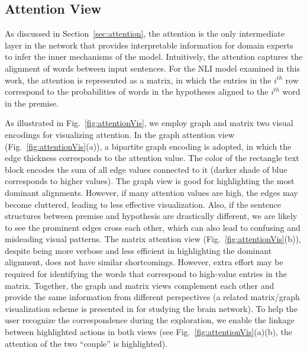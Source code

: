 

\subsection{Attention View}
\label{sec:attentionView}
As discussed in Section~\ref{sec:attention}, the attention is the only intermediate layer in the network that provides interpretable information for domain experts to infer the inner mechanisms of the model.
%
Intuitively, the attention captures the alignment of words between input sentences. For the NLI model examined in this work, the attention is represented as a matrix, in which the entries in the $i^{th}$ row correspond to the probabilities of words in the hypotheses aligned to the $i^{th}$ word in the premise.

As illustrated in Fig.~\ref{fig:attentionVis}, we employ graph and matrix two visual encodings for visualizing attention. In the graph attention view (Fig.~\ref{fig:attentionVis}(a)), a bipartite graph encoding is adopted, in which the edge thickness corresponds to the attention value. The color of the rectangle text block encodes the sum of all edge values connected to it (darker shade of blue corresponds to higher values).
%
The graph view is good for highlighting the most dominant alignments. However, if many attention values are high, the edges may become cluttered, leading to less effective visualization. Also, if the sentence structures between premise and hypothesis are drastically different, we are likely to see the prominent edges cross each other, which can also lead to confusing and misleading visual patterns.
%
The matrix attention view (Fig.~\ref{fig:attentionVis}(b)), despite being more verbose and less efficient in highlighting the dominant alignment, does not have similar shortcomings. However, extra effort may be required for identifying the words that correspond to high-value entries in the matrix. Together, the graph and matrix views complement each other and provide the same information from different perspectives (a related matrix/graph visualization scheme is presented in \cite{MaKenyonForbes2015} for studying the brain network). 
To help the user recognize the correspondence during the exploration, we enable the linkage between highlighted actions in both views (see Fig.~\ref{fig:attentionVis}(a)(b), the attention of the two ``couple'' is highlighted).

